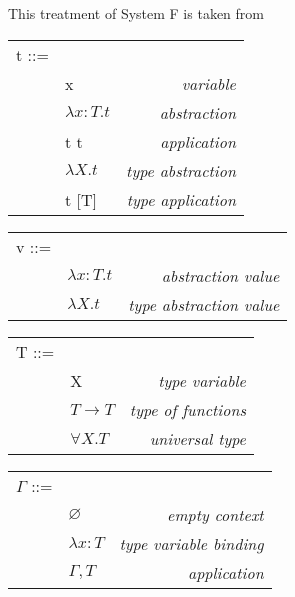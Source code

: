This treatment of System F is taken from~\cite{Pierce:2002:TPL:509043}

\begin{minipage}{0.4\textwidth}
    \begin{tabu}{l l r}
        t ::= & & \\
              & x & \textit{variable} \\
              & $\lambda x:T.t$ & \textit{abstraction} \\
              & t t & \textit{application} \\
              & $\lambda X.t$ & \textit{type abstraction} \\
              & t [T] & \textit{type application} \\
    \end{tabu}
    \begin{tabu}{l l r}
        v ::= & & \\
              & $\lambda x:T.t$ & \textit{abstraction value} \\
              & $\lambda X.t$ & \textit{type abstraction value} \\
    \end{tabu}
    \begin{tabu}{l l r}
        T ::= & & \\
              & X & \textit{type variable} \\
              & $T \rightarrow T $ & \textit{type of functions} \\
              & $\forall X.T$ & \textit{universal type} \\
    \end{tabu}
    \begin{tabu}{l l r}
        $\Gamma$ ::= & & \\
              & $\varnothing$ & \textit{empty context} \\
              & $\lambda x:T$ & \textit{type variable binding} \\
              & $\Gamma ,T$ & \textit{application} \\
    \end{tabu}
\end{minipage}
\hfill\vline\hfill
